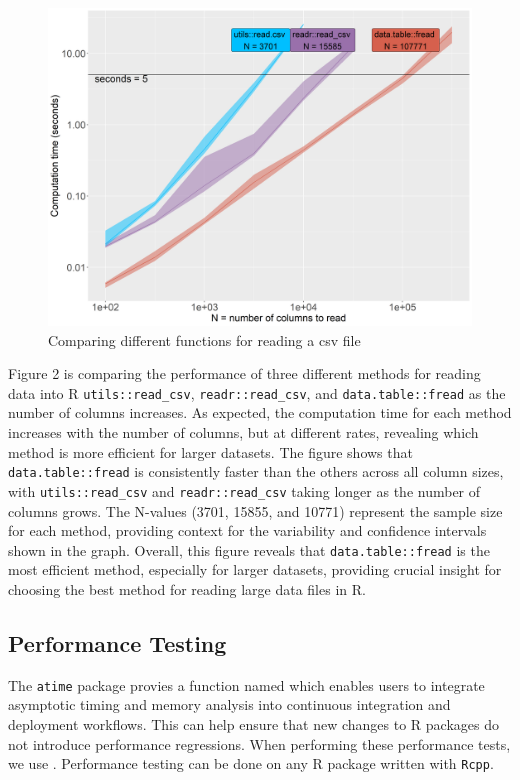 \begin{figure}[H]
    \centering
    \includegraphics[width=0.7\linewidth]{figures/gg.read.3.png}
    \caption{Comparing different functions for reading a csv file}
    \label{fig:label2}
\end{figure}

\noindent Figure 2 is comparing the performance of three different methods for reading data into R \texttt{utils::read\_csv}, \texttt{readr::read\_csv}, and \texttt{data.table::fread} as the number of columns increases. As expected, the computation time for each method increases with the number of columns, but at different rates, revealing which method is more efficient for larger datasets. The figure shows that \texttt{data.table::fread} is consistently faster than the others across all column sizes, with \texttt{utils::read\_csv} and \texttt{readr::read\_csv} taking longer as the number of columns grows. The N-values (3701, 15855, and 10771) represent the sample size for each method, providing context for the variability and confidence intervals shown in the graph. Overall, this figure reveals that \texttt{data.table::fread} is the most efficient method, especially for larger datasets, providing crucial insight for choosing the best method for reading large data files in R.\\

\subsection{Performance Testing}

The \texttt{atime} package provies a function named  which enables users to integrate asymptotic timing and memory analysis into continuous integration and deployment workflows. 
This can help ensure that new changes to R packages do not introduce performance regressions. When performing these performance tests, we use .
Performance testing can be done on any R package written with \texttt{Rcpp}.\\


